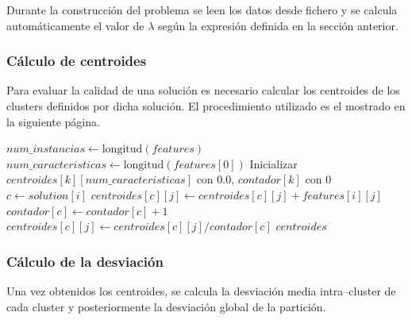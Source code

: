 \documentclass[a4paper,12pt]{article}%
\begin{document}
Durante la construcción del problema se leen los datos desde fichero y se calcula automáticamente el valor de $\lambda$ según la expresión definida en la sección anterior.


\subsubsection*{Cálculo de centroides}

\noindent Para evaluar la calidad de una solución es necesario calcular los centroides de los clusters definidos por dicha solución. El procedimiento utilizado es el mostrado en la siguiente página.

\begin{algorithm}[h]
	\begin{algorithmic}
		\State $num\_instancias \gets \text{longitud}(features)$
		\State $num\_caracteristicas \gets \text{longitud}(features[0])$
		\State Inicializar $centroides[k][num\_caracteristicas]$ con $0.0$, $contador[k]$ con $0$
		\State $c \gets solution[i]$
		\State $centroides[c][j] \gets centroides[c][j] + features[i][j]$
		\EndFor
		\State $contador[c] \gets contador[c] + 1$
		\EndIf
		\EndFor
		\State $centroides[c][j] \gets centroides[c][j] / contador[c]$
		\EndFor
		\EndIf
		\EndFor
		\State \Return $centroides$
		\EndFunction
	\end{algorithmic}
\end{algorithm}

\subsubsection*{Cálculo de la desviación}

\noindent Una vez obtenidos los centroides, se calcula la desviación media intra--cluster de cada cluster y posteriormente la desviación global de la partición.
\end{document}
